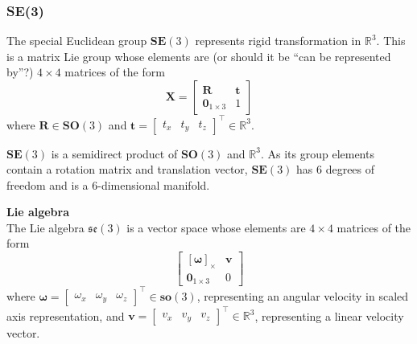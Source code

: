 	\subsubsection{\textbf{SE}(3)}	
		The special Euclidean group $\textbf{SE}(3)$ represents rigid transformation in $\mathbb{R}^3$. This is a matrix Lie group whose elements are (or should it be ``can be represented by''?) $4 \times 4$ matrices of the form
		\begin{equation}
			\textbf{X} = 
			\begin{bmatrix}
				  \mathbf{R}	&	\mathbf{t} \\
				  \textbf{0}_{1 \times 3}		& 	1 
			\end{bmatrix}
		\end{equation}
		where $\mathbf{R} \in \mathbf{SO}(3)$ and 
		$\mathbf{t} = 
		\begin{bmatrix}
			t_x	& t_y & t_z				
		\end{bmatrix}
		^\top \in \mathbb{R}^3$.
		
		$\textbf{SE}(3)$ is a semidirect product of $\textbf{SO}(3)$ and $ \mathbb{R}^3$. As its group elements contain a rotation matrix and translation vector, $\textbf{SE}(3)$ has 6 degrees of freedom and is a 6-dimensional manifold.
			
		\textbf{Lie algebra}\\
		The Lie algebra $\mathfrak{se}(3)$ is a vector space whose elements are $4 \times 4$ matrices of the form
		\begin{equation}
			\begin{bmatrix}
				  [\mathbf{\omega}]_\times	&  \mathbf{v}\\
				  \textbf{0}_{1 \times 3} & 0						  
			\end{bmatrix}
		\end{equation}
		where $\mathbf{\omega} =
		\begin{bmatrix}
			\omega_x & \omega_y & \omega_z				
		\end{bmatrix}
		^\top \in \mathbf{so}(3)$, representing an angular velocity in scaled axis representation, and
		$\mathbf{v} = 
		\begin{bmatrix}
			v_x & v_y & v_z				
		\end{bmatrix}
		^\top \in \mathbb{R}^3$, representing a linear velocity vector.
		
